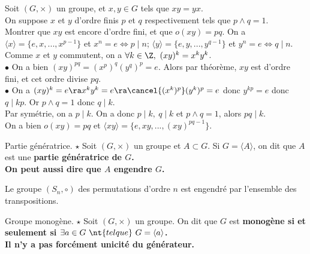 \documentclass[11pt]{article}
\begin{document}
\begin{ex}{}{}
    Soit $(G,\times)$ un groupe, et $x,y\in G$ tels que $xy=yx$.\\
    On suppose $x$ et $y$ d'ordre finis $p$ et $q$ respectivement tels que $p\land q = 1$.\\
    Montrer que $xy$ est encore d'ordre fini, et que $o(xy)=pq$.
    \tcblower
    On a $\langle x \rangle = \{e,x,...,x^{p-1}\}$ et $x^n=e\iff p\mid n$; $\langle y \rangle = \{e,y,...,y^{q-1}\}$ et $y^n=e\iff q\mid n$.\\
    Comme $x$ et $y$ commutent, on a $\forall k \in \Z, ~ (xy)^k=x^ky^k$.\\
    $\bullet$ On a bien $(xy)^{pq}=(x^p)^q(y^q)^p=e$. Alors par théorème, $xy$ est d'ordre fini, et cet ordre divise $pq$.\\
    $\bullet$ On a $(xy)^k=e\ra x^ky^k=e \ra \cancel{(x^k)^p}(y^k)^p=e$ donc $y^{kp}=e$ donc $q \mid kp$. Or $p\land q=1$ donc $q\mid k$.\\
    Par symétrie, on a $p\mid k$. On a donc $p\mid k, ~ q \mid k$ et $p\land q=1$, alors $pq\mid k$.\\
    On a bien $o(xy)=pq$ et $\langle xy \rangle = \{e,xy,...,(xy)^{pq-1}\}$.
\end{ex}

\vspace*{-0.8cm}

\begin{defi}{Partie génératrice. $\star$}{}
    Soit $(G,\times)$ un groupe et $A\subset G$. Si $G=\langle A \rangle$, on dit que $A$ est une \bf{partie génératrice} de $G$.\\
    On peut aussi dire que $A$ \bf{engendre} $G$.
\end{defi}

\vspace*{-0.8cm}

\begin{ex}{}{}
    Le groupe $(S_n,\circ)$ des permutations d'ordre $n$ est engendré par l'ensemble des transpositions.
\end{ex}

\vspace*{-0.8cm}

\begin{defi}{Groupe monogène. $\star$}{}
    Soit $(G,\times)$ un groupe. On dit que $G$ est \bf{monogène} si et seulement si $\exists a \in G ~\nt{tel que}~ G = \langle a \rangle$.\\
    \warning Il n'y a pas forcément unicité du générateur.
\end{defi}
\end{document}
